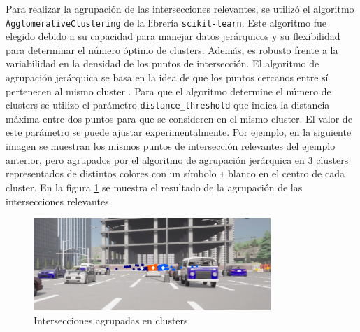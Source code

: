 Para realizar la agrupación de las intersecciones relevantes, se utilizó el algoritmo \texttt{AgglomerativeClustering} de la librería \texttt{scikit-learn}.
Este algoritmo fue elegido debido a su capacidad para manejar datos jerárquicos y su flexibilidad para determinar el número óptimo de clusters. Además,
es robusto frente a la variabilidad en la densidad de los puntos de intersección.
El algoritmo de agrupación jerárquica se basa en la idea de que los puntos cercanos entre sí pertenecen al mismo cluster \cite{tan2005introduction}.
Para que el algoritmo determine el número de clusters se utilizo el parámetro \texttt{distance\_threshold} que indica la distancia máxima
entre dos puntos para que se consideren en el mismo cluster. El valor de este parámetro se puede ajustar experimentalmente.
Por ejemplo, en la siguiente imagen se muestran los mismos puntos de intersección relevantes del ejemplo anterior,
pero agrupados por el algoritmo de agrupación jerárquica en 3 clusters representados de distintos colores con un símbolo \texttt{+} blanco en el centro de cada cluster.
En la figura \ref{fig:clusters} se muestra el resultado de la agrupación de las intersecciones relevantes.
\begin{figure}[!ht]
    \centering
    \includegraphics[width=0.8\textwidth]{img/reticule/AgglomerativeClustering}
    \caption{Intersecciones agrupadas en clusters}
    \label{fig:clusters}
\end{figure}



